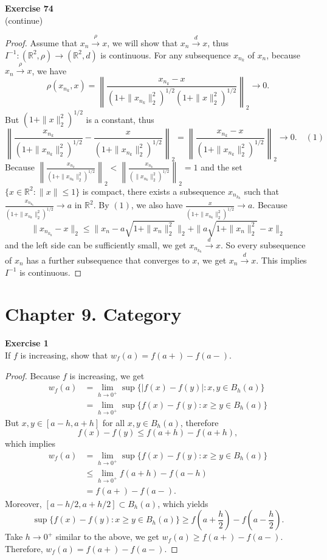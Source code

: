 \documentclass[12pt, a4paper]{article}
\theoremstyle{plain}
\newcommand{\R}{\mathbb{R}}
\newenvironment{exercise}[2][Exercise]
    { \begin{mdframed}[backgroundcolor=gray!20] \textbf{#1 #2} \\}
    {  \end{mdframed}}
\begin{document}
\begin{exercise}{74}
(continue)
\end{exercise}
	\begin{proof}
	Assume that $x_n\xrightarrow{\rho}x$, we will show that $x_n\xrightarrow{d}x$, thus $I^{-1}:(\R^2,\rho)\rightarrow (\R^2,d)$ is continuous. For any subsequence $x_{n_k}$ of $x_n$, because $x_n\xrightarrow{\rho}x$, we have
	\[
	\rho(x_{n_k},x)=\left\|\frac{x_{n_k}-x}{(1+\|x_{n_k}\|_2^2)^{1/2}(1+\|x\|_2^2)^{1/2}}\right\|_2\rightarrow 0.
	\]
	But $(1+\|x\|_2^2)^{1/2}$ is a constant, thus 
	\[
	\left\|\frac{x_{n_k}}{(1+\|x_{n_k}\|_2^2)^{1/2}}-\frac{x}{(1+\|x_{n_k}\|_2^2)^{1/2}}\right\|_2=\left\|\frac{x_{n_k}-x}{(1+\|x_{n_k}\|_2^2)^{1/2}}\right\|_2\rightarrow 0.\quad (1)
	\]
	Because $\left\|\frac{x_{n_k}}{(1+\|x_{n_k}\|_2^2)^{1/2}}\right\|_2<\left\|\frac{x_{n_k}}{(\|x_{n_k}\|_2^2)^{1/2}}\right\|_2=1$ and the set $\{x\in \R^2:\|x\|\leq 1\}$ is compact, there exists a subsequence $x_{n_{k_h}}$ such that $\frac{x_{n_{k_h}}}{(1+\|x_{n_k}\|_2^2)^{1/2}}\rightarrow a$ in $\R^2$. By $(1)$, we also have $\frac{x}{(1+\|x_{n_k}\|_2^2)^{1/2}}\rightarrow a$. Because 
	\[
	\|x_{n_{k_h}}-x\|_2\leq \|x_n-a\sqrt{1+\|x_n\|_2^2}\|_2+\|a\sqrt{1+\|x_n\|_2^2}-x\|_2
	\]
	and the left side can be sufficiently small, we get $x_{n_{k_h}}\xrightarrow{d} x$. So every subsequence of $x_n$ has a further subsequence that converges to $x$, we get $x_n\xrightarrow{d} x$. This implies $I^{-1}$ is continuous.
	\end{proof}
	
\section*{Chapter 9. Category}

\begin{exercise}{1}
If $f$ is increasing, show that $w_f(a)=f(a+)-f(a-)$.
\end{exercise}
	\begin{proof}
	Because $f$ is increasing, we get
	\begin{align*}
	w_f(a) &= \lim_{h\rightarrow 0^+}\sup\{|f(x)-f(y)|:x,y\in B_h(a)\}\\
	&= \lim_{h\rightarrow 0^+}\sup\{f(x)-f(y):x\geq y\in B_h(a)\}
	\end{align*}
	But $x,y\in [a-h,a+h]$ for all $x,y\in B_h(a)$, therefore
	\[
	f(x)-f(y)\leq f(a+h)-f(a+h),
	\]
	which implies
	\begin{align*}
	w_f(a)&=\lim_{h\rightarrow 0^+}\sup\{f(x)-f(y):x\geq y\in B_h(a)\}\\
	&\leq \lim_{h\rightarrow 0^+}f(a+h)-f(a-h)\\
	&=f(a+)-f(a-).
	\end{align*}
	Moreover, $[a-h/2,a+h/2]\subset B_h(a)$, which yields 
	\[
	\sup\{f(x)-f(y):x\geq y\in B_h(a)\} \geq f\left(a+\frac{h}{2}\right)-f\left(a-\frac{h}{2}\right).
	\]
	Take $h\rightarrow 0^+$ similar to the above, we get $w_f(a)\geq f(a+)-f(a-)$. Therefore, $w_f(a)= f(a+)-f(a-)$.
	\end{proof}
\end{document}
